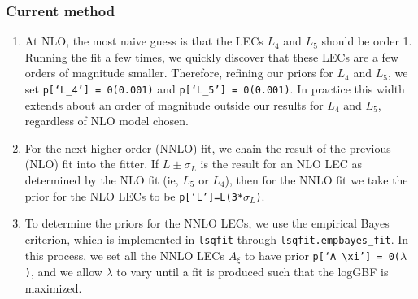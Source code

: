 \documentclass[prd,tightenlines,preprintnumbers,showpacs,superscriptaddress,notitlepage,eqsecnum,floatfix,notitlepage]{revtex4-1}
\begin{document}
\subsubsection{Current method}
\begin{enumerate}
	\item At NLO, the most naive guess is that the LECs $L_4$ and $L_5$ should be order 1. Running the fit a few times, we quickly discover that these LECs are a few orders of magnitude smaller. Therefore, refining our priors for $L_4$ and $L_5$, we set \texttt{p[`L\_4'] = 0(0.001)} and \texttt{p[`L\_5'] = 0(0.001)}. In practice this width extends about an order of magnitude outside our results for $L_4$ and $L_5$, regardless of NLO model chosen.

	\item For the next higher order (NNLO) fit, we chain the result of the previous (NLO) fit into the fitter. If $L\pm\sigma_L$ is the result for an NLO LEC as determined by the NLO fit (ie, $L_5$ or $L_4$), then for the NNLO fit we take the prior for the NLO LECs to be \texttt{p[`L']=L(3*$\sigma_L$)}.

	\item To determine the priors for the NNLO LECs, we use the empirical Bayes criterion, which is implemented in \texttt{lsqfit} through \texttt{lsqfit.empbayes\_fit}. In this process, we set all the NNLO LECs $A_\xi$ to have prior \texttt{p[`A$_\xi$'] = 0($\lambda$)}, and we allow $\lambda$ to vary until a fit is produced such that the logGBF is maximized.
\end{enumerate}
\end{document}
